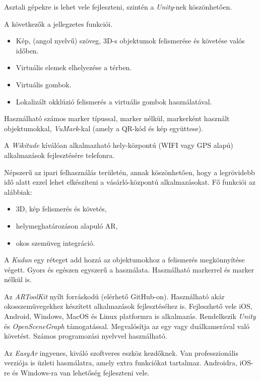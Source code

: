 Asztali gépekre is lehet vele fejleszteni, szintén a \textit{Unity}-nek köszönhetően. 
  
A következők a jellegzetes funkciói.
\begin{itemize}
\item  Kép, (angol nyelvű) szöveg, 3D-s objektumok felismerése és követése valós időben.
\item  Virtuális elemek elhelyezése a térben.  
\item  Virtuális gombok.
\item  Lokalizált okklúzió felismerés a virtuális gombok használatával.
\end{itemize}
Használható számos marker típussal, marker nélkül, markerként használt objektumokkal, \textit{VuMark}-kal (amely a QR-kód és kép együttese).


A \textit{Wikitude} kíválóan alkalmazható hely-központú (WIFI vagy GPS alapú) alkalmazások fejlesztésére telefonra. 

Népszerű az ipari felhasználás területén, annak köszönhetően, hogy a legrövidebb idő alatt ezzel lehet elkészíteni a vásárló-központú alkalmazásokat.
Fő funkciói az alábbiak:
\begin{itemize}
\item 3D, kép felismerés és követés,
\item helymeghatározáson alapuló AR,
\item okos szemüveg integráció.
\end{itemize}


A \textit{Kudan} egy réteget add hozzá az objektumokhoz a felismerés megkönnyítése végett. Gyors és egészen egyszerű a használata. 
Használható markerrel és marker nélkül is.


Az \textit{ARToolKit} nyílt forráskodú (elérhető GitHub-on). Használható akár okosszemüvegekhez készített alkalmazások fejlesztéséhez is. Fejleszhető vele iOS, Android, Windows, MacOS és Linux platformra is alkalmazás. 
Rendelkezik \textit{Unity} és \textit{OpenSceneGraph} támogatással.
Megvalósítja az egy vagy duálkamerával való követést. Számos programozási nyelvvel használható.


Az \textit{EasyAr} ingyenes, kiváló szoftveres eszköz kezdőknek. Van professzionális verziója is üzleti használatra, amely extra funkciókat tartalmaz. Androidra, iOS-re és Windows-ra van lehetőség fejleszteni vele.

